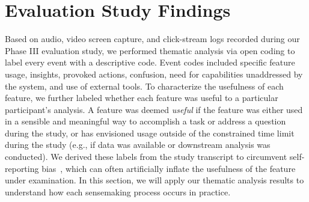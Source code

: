  \section{Evaluation Study Findings\label{sec:eval_findings}}
 Based on audio, video screen capture,
 and click-stream logs recorded
 during our Phase III evaluation study,
 we performed thematic analysis via open coding to label every event with a descriptive code. Event codes included specific feature usage,
 insights,
 provoked actions, confusion,
 need for capabilities unaddressed
 by the system, and use of external tools. To characterize the usefulness
 of each feature, we further labeled whether each
 feature was useful to a particular participant's analysis.
 A feature was deemed \textit{useful}
 if the feature was either used in a sensible
 and meaningful way to accomplish a task or address a question during the study,
 or has envisioned usage outside of the constrained
 time limit during the study
 (e.g., if data was available or downstream analysis was conducted).
 We derived these labels from the study transcript
 to circumvent self-reporting bias~\cite{Williams2017},
 which can often artificially inflate
 the usefulness of the feature under examination.
 In this section, we will apply our thematic analysis results to understand how each sensemaking process occurs in practice.%

